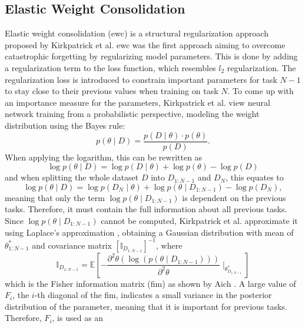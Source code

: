 \subsection{Elastic Weight Consolidation}
\label{sec:Related_work:Continual_Learning:EWC}
Elastic weight consolidation (\gls{ewc}) \cite{kirkpatrick2017overcoming} is a structural regularization approach proposed by Kirkpatrick et al.
\gls{ewc} was the first approach aiming to overcome catastrophic forgetting by regularizing model parameters. This is done by adding a regularization
term to the loss function, which resembles $l_2$ regularization. The regularization loss is introduced to constrain important parameters for
task $N-1$ to stay close to their previous values when training on task $N$. To come up with an importance measure for the parameters,
Kirkpatrick et al. view neural network training from a probabilistic perspective, modeling the weight distribution using the Bayes rule:
\begin{equation}
    p(\theta \mid D) = \frac{p(D \mid \theta) \cdot p(\theta)}{p(D)}.
\end{equation}
When applying the logarithm, this can be rewritten as
\begin{equation}
    \log p(\theta \mid D) = \log p(D \mid \theta) + \log p(\theta) - \log p(D)
\end{equation}
and when splitting the whole dataset $D$ into $D_{1:N-1}$ and $D_N$, this equates to
\begin{equation}
    \log p(\theta \mid D) = \log p(D_N \mid \theta) + \log p(\theta \mid D_{1:N-1}) - \log p(D_N),
\end{equation}
meaning that only the term $\log p(\theta \mid D_{1:N-1})$ is dependent on the previous tasks. Therefore, it must contain the full information 
about all previous tasks. Since $\log p(\theta \mid D_{1:N-1})$ cannot be computed, Kirkpatrick et al. approximate it using Laplace's approximation
\cite{mackay2003information}, obtaining a Gaussian distribution with mean of $\theta^*_{1:N-1}$ and covariance matrix $[\mathbb{I}_{D_{1:N-1}}]^{-1}$,
where
\begin{equation}
    \mathbb{I}_{D_{1:N-1}} = \mathbb{E} [- \frac{\partial^2 \theta (\log (p(\theta \mid D_{1:N-1})))}{\partial^2 \theta} \mid_{\theta^*_{D_{1:N-1}}}]
\end{equation} 
which is the Fisher information matrix (\gls{fim}) as shown by Aich \cite{aich2021elastic}. A large value of $F_i$, the $i$-th diagonal of the \gls{fim},
indicates a small variance in the posterior distribution of the parameter, meaning that it is important for previous tasks. Therefore, $F_i$, is used as an
